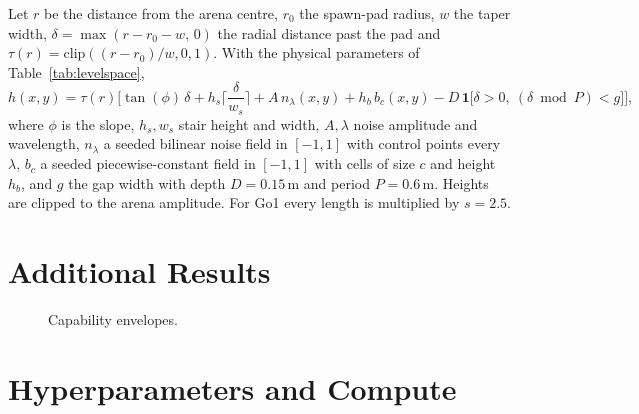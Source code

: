 Let $r$ be the distance from the arena centre, $r_0$ the spawn-pad radius,
$w$ the taper width, $\delta=\max(r-r_0-w,\,0)$ the radial distance past
the pad and $\tau(r)=\mathrm{clip}((r-r_0)/w,0,1)$. With the physical
parameters of Table~\ref{tab:levelspace},
\begin{equation*}
  h(x,y) = \tau(r)\Big[\tan(\phi)\,\delta
    + h_s\Big\lceil\frac{\delta}{w_s}\Big\rceil
    + A\,n_\lambda(x,y) + h_b\,b_c(x,y)
    - D\,\mathbf{1}\big[\delta>0,\ (\delta \bmod P) < g\big]\Big],
\end{equation*}
where $\phi$ is the slope, $h_s,w_s$ stair height and width, $A,\lambda$
noise amplitude and wavelength, $n_\lambda$ a seeded bilinear noise field
in $[-1,1]$ with control points every $\lambda$, $b_c$ a seeded
piecewise-constant field in $[-1,1]$ with cells of size $c$ and height
$h_b$, and $g$ the gap width with depth $D=0.15$\,m and period $P=0.6$\,m.
Heights are clipped to the arena amplitude. For Go1 every length is
multiplied by $s=2.5$.

\section{Additional Results}
\label{app:extra}

\begin{figure}[t]
  \centering
  \caption{Capability envelopes.}
  \label{fig:envelopes}
\end{figure}

\section{Hyperparameters and Compute}
\label{app:compute}

